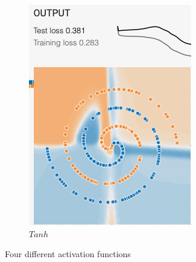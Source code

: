\documentclass[12pt,a4paper]{article}
\begin{document}
\begin{enumerate}
\begin{figure}[H]
\begin{subfigure}[H]{0.2\textwidth}
				\includegraphics[width=\textwidth]{Figures/activation/tanh}
				\caption{$Tanh$}
			\end{subfigure}
		\vspace{-0.1cm}
			\caption{Four different activation functions}
		\end{figure}
		
		\vspace{-0.5cm}
		

\end{enumerate}
\end{document}
